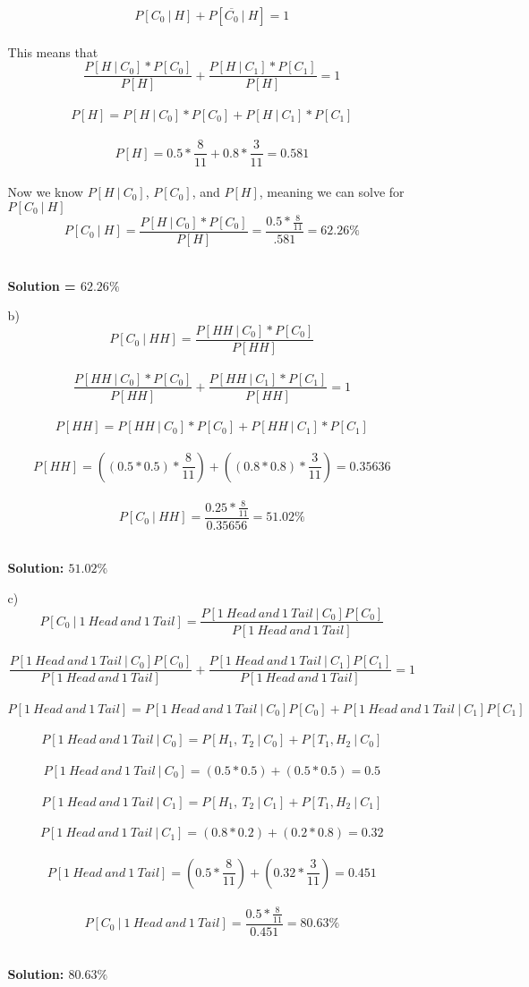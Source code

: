 \documentclass[11pt]{article}
\begin{document}
\begin{enumerate}
\begin{itemize}
$$ P[C_0\ |\ H] + P[\overline{C_0}\ |\ H] = 1$$
\\
This means that
$$\frac{P[H\ |\ C_0] * P[C_0]}{P[H]} + \frac{P[H\ |\ C_1] * P[C_1]}{P[H]} = 1$$
\\
$$P[H] = P[H\ |\ C_0] * P[C_0] + P[H\ |\ C_1] * P[C_1]$$
\\
$$P[H] = 0.5* \frac{8}{11} + 0.8 * \frac{3}{11} = 0.581$$
\\
Now we know $P[H\ |\ C_0]$, $P[C_0]$, and $P[H]$, meaning we can solve for $P[C_0\ |\ H]$
\\
$$ P[C_0\ |\ H] = \frac{P[H\ |\ C_0] * P[C_0]}{P[H]} = \frac{0.5 * \frac{8}{11}}{.581} = 62.26\%$$\\
\begin{center}
\textbf{Solution = $62.26\%$}
\end{center}
\newpage	
\item[b) ] 
$$ P[C_0\ |\ HH] = \frac{P[HH\ |\ C_0] * P[C_0]}{P[HH]} $$
\\
$$\frac{P[HH\ |\ C_0] * P[C_0]}{P[HH]} + \frac{P[HH\ |\ C_1] * P[C_1]}{P[HH]} = 1$$
\\
$$P[HH] = P[HH\ |\ C_0] * P[C_0] + P[HH\ |\ C_1] * P[C_1]$$
\\
$$P[HH] = ((0.5 * 0.5) * \frac{8}{11}) + ((0.8 * 0.8) * \frac{3}{11}) = 0.35636$$
\\
$$ P[C_0\ |\ HH] = \frac{0.25 * \frac{8}{11}}{0.35656} = 51.02\% $$
\\
\begin{center}
\textbf{Solution: $51.02\%$}
\end{center}
\newpage
\item[c) ] $$ P[C_0\ |\ 1\ Head\ and\ 1\ Tail] = \frac{P[1\ Head\ and\ 1\ Tail\ |\ C_0]P[C_0]}{P[1\ Head\ and\ 1\ Tail]}$$
\\
$$ \frac{P[1\ Head\ and\ 1\ Tail\ |\ C_0]P[C_0]}{P[1\ Head\ and\ 1\ Tail]} +  \frac{P[1\ Head\ and\ 1\ Tail\ |\ C_1]P[C_1]}{P[1\ Head\ and\ 1\ Tail]} = 1$$
\\
$$P[1\ Head\ and\ 1\ Tail] = P[1\ Head\ and\ 1\ Tail\ |\ C_0]P[C_0] + P[1\ Head\ and\ 1\ Tail\ |\ C_1]P[C_1]$$
\\
$$P[1\ Head\ and\ 1\ Tail\ |\ C_0] = P[H_1,\ T_2\ |\ C_0] + P[T_1, H_2\ |\ C_0]$$
\\
$$P[1\ Head\ and\ 1\ Tail\ |\ C_0] = (0.5 * 0.5) + (0.5 * 0.5) = 0.5$$
\\
$$P[1\ Head\ and\ 1\ Tail\ |\ C_1] = P[H_1,\ T_2\ |\ C_1] + P[T_1, H_2\ |\ C_1]$$
\\
$$P[1\ Head\ and\ 1\ Tail\ |\ C_1] = (0.8 * 0.2) + (0.2 * 0.8) = 0.32$$
\\
$$P[1\ Head\ and\ 1\ Tail] = (0.5 * \frac{8}{11}) + (0.32 * \frac{3}{11}) = 0.451$$
\\
$$P[C_0\ |\ 1\ Head\ and\ 1\ Tail] = \frac{0.5 * \frac{8}{11}}{0.451} = 80.63\%$$
\\
\begin{center}
\textbf{Solution: $80.63\%$}
\end{center}


\end{itemize}
\end{enumerate}
\end{document}
